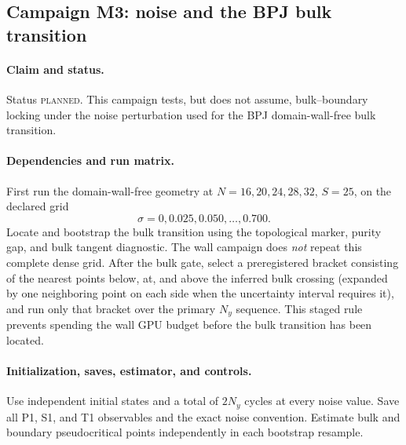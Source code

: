 \documentclass[aps,prx,twocolumn,floatfix,nofootinbib,superscriptaddress,longbibliography]{revtex4-2}
\newcommand{\planned}{\textsc{planned}}
\begin{document}
\subsection{Campaign M3: noise and the BPJ bulk transition}
\label{camp:M3}
\paragraph*{Claim and status.}
Status \planned.  This campaign tests, but does not assume, bulk--boundary locking under the
noise perturbation used for the BPJ domain-wall-free bulk transition.

\paragraph*{Dependencies and run matrix.}
First run the domain-wall-free geometry at $N=16,20,24,28,32$, $S=25$, on the declared
grid
\begin{equation}
 \sigma=0,0.025,0.050,\ldots,0.700.
 \label{eq:M3-production-noise-grid}
\end{equation}
Locate and bootstrap the bulk transition using the topological marker, purity gap, and bulk
tangent diagnostic.  The wall campaign does \emph{not} repeat this complete dense grid.
After the bulk gate, select a preregistered bracket consisting of the nearest points below,
at, and above the inferred bulk crossing (expanded by one neighboring point on each side
when the uncertainty interval requires it), and run only that bracket over the primary
$N_y$ sequence.  This staged rule prevents spending the wall GPU budget before the bulk
transition has been located.

\paragraph*{Initialization, saves, estimator, and controls.}
Use independent initial states and a total of $2N_y$ cycles at every noise value.  Save all P1, S1, and T1 observables and the
exact noise convention.  Estimate bulk and boundary pseudocritical points independently in
each bootstrap resample.
\end{document}
